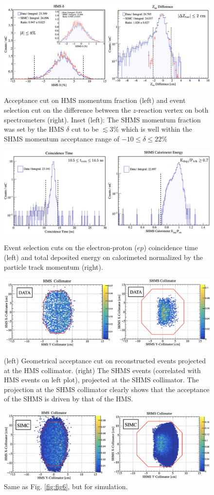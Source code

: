 \documentclass[aps, prl]{revtex4-2}  %
\begin{document}
\begin{figure}
\includegraphics[scale=0.30]{plots/deltaAcc_and_ZtarCUT_80MeV_35deg.png}
\caption{Acceptance cut on HMS momentum fraction (left) and event selection cut on the difference between the $z$-reaction vertex on both spectrometers (right).
  Inset (left): The SHMS momentum fraction was set by the HMS $\delta$ cut to be $\lesssim$3$\%$ which is well within the SHMS momentum acceptance range of $-10 \leq \delta \leq22 \%$}
\label{fig:fig4}
\includegraphics[scale=0.30]{plots/coin_and_eCal_CUT_80MeV_35deg.png}
\caption{Event selection cuts on the electron-proton ($ep$) coincidence time (left) and total deposited energy on calorimeted normalized by the particle track momentum (right).}
\label{fig:fig5}
\includegraphics[scale=0.30]{plots/collimator_CUT_80MeV_35deg_data.png}
\caption{(left) Geometrical acceptance cut on reconstructed events projected at the HMS collimator. (right) The SHMS events (correlated with HMS events on left plot), projected at the SHMS collimator.
  The projection at the SHMS collimator clearly shows that the acceptance of the SHMS is driven by that of the HMS.}
\label{fig:fig6}
\includegraphics[scale=0.30]{plots/collimator_CUT_80MeV_35deg_SIMC.png}
\caption{Same as Fig. \ref{fig:fig6}, but for simulation.}
\label{fig:fig7}
\end{figure}
\clearpage
\end{document}
